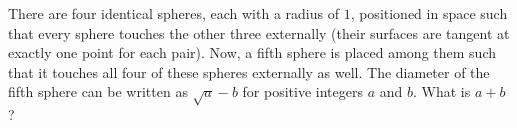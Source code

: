There are four identical spheres, each with a radius of $1$, positioned in space such that every sphere touches the other three externally (their surfaces are tangent at exactly one point for each pair). Now, a fifth sphere is placed among them such that it touches all four of these spheres externally as well. The diameter of the fifth sphere can be written as $\sqrt{a}-b$ for positive integers $a$ and $b$. What is $a+b$?
